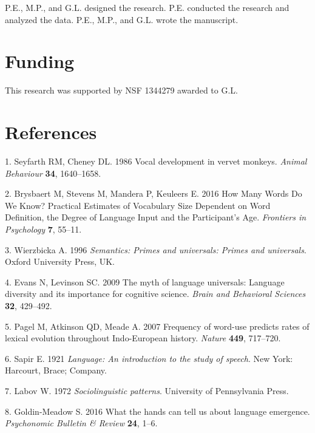 \documentclass[english,floatsintext,man]{apa6}
\theoremstyle{definition}
\theoremstyle{definition}
\theoremstyle{definition}
\theoremstyle{remark}
\begin{document}
P.E., M.P., and G.L. designed the research. P.E. conducted the research
and analyzed the data. P.E., M.P., and G.L. wrote the manuscript.

\hypertarget{funding}{%
\section{Funding}\label{funding}}

This research was supported by NSF 1344279 awarded to G.L.

\hypertarget{references}{%
\section{References}\label{references}}

\setlength{\parindent}{-0.5in}
\setlength{\leftskip}{0.5in}

\hypertarget{refs}{}
\leavevmode\hypertarget{ref-Seyfarth:1986tw}{}%
1. Seyfarth RM, Cheney DL. 1986 Vocal development in vervet monkeys.
\emph{Animal Behaviour} \textbf{34}, 1640--1658.

\leavevmode\hypertarget{ref-Brysbaert:2016fg}{}%
2. Brysbaert M, Stevens M, Mandera P, Keuleers E. 2016 How Many Words Do
We Know? Practical Estimates of Vocabulary Size Dependent on Word
Definition, the Degree of Language Input and the Participant's Age.
\emph{Frontiers in Psychology} \textbf{7}, 55--11.

\leavevmode\hypertarget{ref-Wierzbicka:1996sm}{}%
3. Wierzbicka A. 1996 \emph{Semantics: Primes and universals: Primes and
universals}. Oxford University Press, UK.

\leavevmode\hypertarget{ref-Evans:2009dk}{}%
4. Evans N, Levinson SC. 2009 The myth of language universals: Language
diversity and its importance for cognitive science. \emph{Brain and
Behavioral Sciences} \textbf{32}, 429--492.

\leavevmode\hypertarget{ref-Pagel:2007br}{}%
5. Pagel M, Atkinson QD, Meade A. 2007 Frequency of word-use predicts
rates of lexical evolution throughout Indo-European history.
\emph{Nature} \textbf{449}, 717--720.

\leavevmode\hypertarget{ref-Sapir:1921}{}%
6. Sapir E. 1921 \emph{Language: An introduction to the study of
speech}. New York: Harcourt, Brace; Company.

\leavevmode\hypertarget{ref-Labov:1972}{}%
7. Labov W. 1972 \emph{Sociolinguistic patterns}. University of
Pennsylvania Press.

\leavevmode\hypertarget{ref-GoldinMeadow:2016bw}{}%
8. Goldin-Meadow S. 2016 What the hands can tell us about language
emergence. \emph{Psychonomic Bulletin \& Review} \textbf{24}, 1--6.
\end{document}
